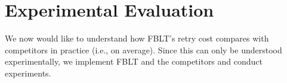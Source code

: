 \documentclass[conference]{IEEEtran}
\begin{document}
\section{Experimental Evaluation}\label{exp_eval}

We now would like to understand how FBLT's retry cost compares with competitors in practice (i.e., on average). Since this can only be understood experimentally, we implement FBLT and the competitors and conduct experiments. 

\end{document}
